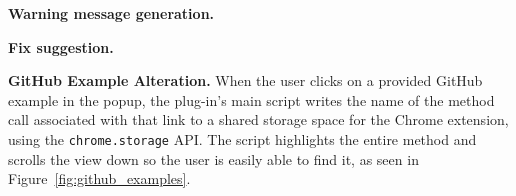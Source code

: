 

{\bf Warning message generation.}

{\bf Fix suggestion.} 

{\bf GitHub Example Alteration.} When the user clicks on a provided GitHub example in the popup, the plug-in's main script writes the name of the method call associated with that link to a shared storage space for the Chrome extension, using the {\tt chrome.storage} API. The script highlights the entire method and scrolls the view down so the user is easily able to find it, as seen in Figure~\ref{fig:github_examples}.